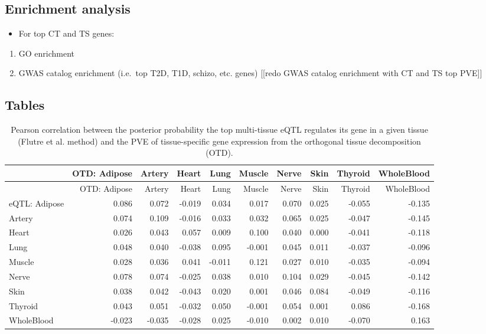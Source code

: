 \documentclass[]{article}
\begin{document}
\subsection{Enrichment analysis}\label{enrichment-analysis}

\begin{itemize}
\itemsep1pt\parskip0pt
\item
  For top CT and TS genes:
\end{itemize}

\begin{enumerate}
\def\labelenumi{\arabic{enumi}.}
\itemsep1pt\parskip0pt
\item
  GO enrichment
\item
  GWAS catalog enrichment (i.e.~top T2D, T1D, schizo, etc. genes)
  {[}{[}redo GWAS catalog enrichment with CT and TS top PVE{]}{]}
\end{enumerate}

\subsection{Tables}\label{tables}

\begin{longtable}[c]{@{}lrrrrrrrrr@{}}
\caption{Pearson correlation between the posterior probability the top
multi-tissue eQTL regulates its gene in a given tissue (Flutre et al.
method) and the PVE of tissue-specific gene expression from the
orthogonal tissue decomposition (OTD).}\tabularnewline
\toprule
& OTD: Adipose & Artery & Heart & Lung & Muscle & Nerve & Skin & Thyroid
& WholeBlood\tabularnewline
\midrule
\endfirsthead
\toprule
& OTD: Adipose & Artery & Heart & Lung & Muscle & Nerve & Skin & Thyroid
& WholeBlood\tabularnewline
\midrule
\endhead
eQTL: Adipose & 0.086 & 0.072 & -0.019 & 0.034 & 0.017 & 0.070 & 0.025 &
-0.055 & -0.135\tabularnewline
Artery & 0.074 & 0.109 & -0.016 & 0.033 & 0.032 & 0.065 & 0.025 & -0.047
& -0.145\tabularnewline
Heart & 0.026 & 0.043 & 0.057 & 0.009 & 0.100 & 0.040 & 0.000 & -0.041 &
-0.118\tabularnewline
Lung & 0.048 & 0.040 & -0.038 & 0.095 & -0.001 & 0.045 & 0.011 & -0.037
& -0.096\tabularnewline
Muscle & 0.028 & 0.036 & 0.041 & -0.011 & 0.121 & 0.027 & 0.010 & -0.035
& -0.094\tabularnewline
Nerve & 0.078 & 0.074 & -0.025 & 0.038 & 0.010 & 0.104 & 0.029 & -0.045
& -0.142\tabularnewline
Skin & 0.038 & 0.042 & -0.043 & 0.020 & 0.001 & 0.046 & 0.084 & -0.049 &
-0.116\tabularnewline
Thyroid & 0.043 & 0.051 & -0.032 & 0.050 & -0.001 & 0.054 & 0.001 &
0.086 & -0.168\tabularnewline
WholeBlood & -0.023 & -0.035 & -0.028 & 0.025 & -0.010 & 0.002 & 0.010 &
-0.070 & 0.163\tabularnewline
\bottomrule
\end{longtable}
\end{document}
